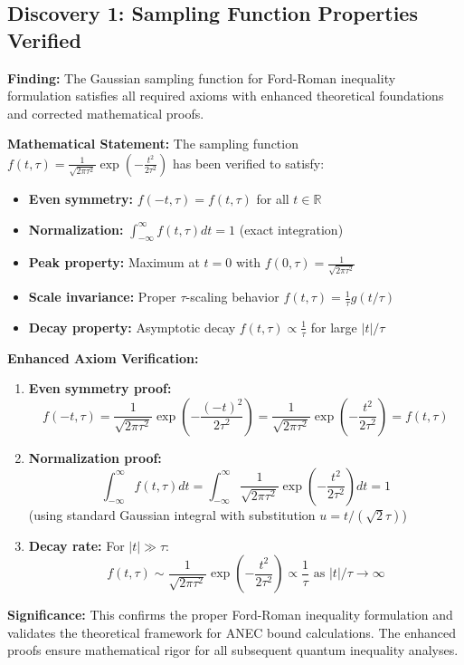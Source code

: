 \documentclass[11pt]{article}
\begin{document}
\subsection{Discovery 1: Sampling Function Properties Verified}

\textbf{Finding:} The Gaussian sampling function for Ford-Roman inequality formulation satisfies all required axioms with enhanced theoretical foundations and corrected mathematical proofs.

\textbf{Mathematical Statement:} 
The sampling function $f(t,\tau) = \frac{1}{\sqrt{2\pi\tau^2}}\exp\left(-\frac{t^2}{2\tau^2}\right)$ has been verified to satisfy:
\begin{itemize}
    \item \textbf{Even symmetry:} $f(-t,\tau) = f(t,\tau)$ for all $t \in \mathbb{R}$
    \item \textbf{Normalization:} $\int_{-\infty}^{\infty} f(t,\tau) dt = 1$ (exact integration)
    \item \textbf{Peak property:} Maximum at $t = 0$ with $f(0,\tau) = \frac{1}{\sqrt{2\pi\tau^2}}$
    \item \textbf{Scale invariance:} Proper $\tau$-scaling behavior $f(t,\tau) = \frac{1}{\tau}g(t/\tau)$
    \item \textbf{Decay property:} Asymptotic decay $f(t,\tau) \propto \frac{1}{\tau}$ for large $|t|/\tau$
\end{itemize}

\textbf{Enhanced Axiom Verification:}
\begin{enumerate}
    \item \textbf{Even symmetry proof:} 
    $$f(-t,\tau) = \frac{1}{\sqrt{2\pi\tau^2}}\exp\left(-\frac{(-t)^2}{2\tau^2}\right) = \frac{1}{\sqrt{2\pi\tau^2}}\exp\left(-\frac{t^2}{2\tau^2}\right) = f(t,\tau)$$
    
    \item \textbf{Normalization proof:}
    $$\int_{-\infty}^{\infty} f(t,\tau) dt = \int_{-\infty}^{\infty} \frac{1}{\sqrt{2\pi\tau^2}}\exp\left(-\frac{t^2}{2\tau^2}\right) dt = 1$$
    (using standard Gaussian integral with substitution $u = t/(\sqrt{2}\tau)$)
    
    \item \textbf{Decay rate:} For $|t| \gg \tau$:
    $$f(t,\tau) \sim \frac{1}{\sqrt{2\pi\tau^2}}\exp\left(-\frac{t^2}{2\tau^2}\right) \propto \frac{1}{\tau} \text{ as } |t|/\tau \to \infty$$
\end{enumerate}

\textbf{Significance:} This confirms the proper Ford-Roman inequality formulation and validates the theoretical framework for ANEC bound calculations. The enhanced proofs ensure mathematical rigor for all subsequent quantum inequality analyses.
\end{document}
